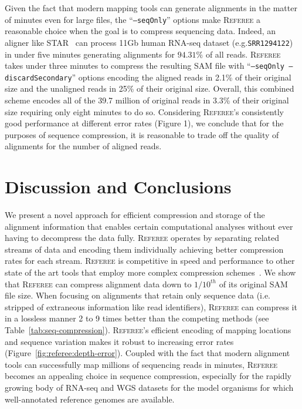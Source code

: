 \documentclass[12pt]{cmuthesis}
\newcommand{\refer}{\textsc{Referee}\xspace}
\begin{document}

  Given the fact that modern mapping tools can generate alignments in the matter of minutes even for large files, the ``\texttt{--seqOnly}'' options make \refer a reasonable choice when the goal is to compress sequencing data. Indeed, an  aligner like STAR~\cite{DobinSTAR} can process 11Gb human RNA-seq dataset (e.g.\@ \texttt{SRR1294122}) in under five minutes generating alignments for $94.31\%$ of all reads. \refer takes under three minutes to compress the resulting SAM file with ``\texttt{--seqOnly --discardSecondary}'' options encoding the aligned reads in 2.1\% of their original size and the unaligned reads in 25\% of their original size. Overall, this combined scheme encodes all of the 39.7 million of original reads in 3.3\% of their original size requiring only eight minutes to do so. Considering \refer's consistently good performance at different error rates (Figure 1), we conclude that for the purposes of sequence compression, it is reasonable to trade off the quality of alignments for the number of aligned reads.





\section{Discussion and Conclusions}

We present a novel approach for efficient compression and storage of the  alignment information that enables certain computational analyses without ever having to decompress the data fully. \refer operates by separating related streams of data and encoding them individually achieving better compression rates for each stream. \refer is competitive in speed and performance to other state of the art tools that employ more complex compression schemes~\cite{Sahinalp2015,Jones2012}. We show that \refer can compress alignment data down to $1/10^{th}$ of its original SAM file size. When focusing on alignments that retain only sequence data (i.e. stripped of extraneous information like read identifiers), \refer can compress it in a lossless manner 2 to 9 times better than the competing methods (see Table~\ref{tab:seq-compression}). \refer's efficient encoding of mapping locations and sequence variation makes it robust to increasing error rates (Figure~\ref{fig:referee:depth-error}). Coupled with the fact that modern alignment tools can successfully map millions of sequencing reads in minutes, \refer becomes an appealing choice in sequence compression, especially for the rapidly growing body of RNA-seq and WGS datasets for the model organisms for which well-annotated reference genomes are available.
\end{document}
